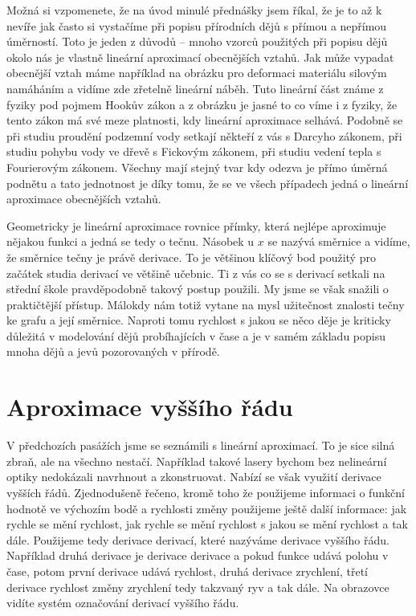 \documentclass[12pt]{article}
\begin{document}
Možná si vzpomenete, že na úvod minulé přednášky jsem říkal, že je to až k nevíře jak často si vystačíme při popisu přírodních dějů s přímou a nepřímou úměrností. Toto je jeden z důvodů -- mnoho vzorců použitých při popisu dějů okolo nás je vlastně lineární aproximací obecnějších vztahů. Jak může vypadat obecnější vztah máme například na obrázku pro deformaci materiálu silovým namáháním a vidíme zde zřetelně lineární náběh. Tuto lineární část známe z fyziky pod pojmem Hookův zákon a z obrázku je jasné to co víme i z fyziky, že tento zákon má své meze platnosti, kdy lineární aproximace selhává. Podobně se při studiu proudění podzemní vody setkají někteří z vás s Darcyho zákonem, při studiu pohybu vody ve dřevě s Fickovým zákonem, při studiu vedení tepla s Fourierovým zákonem. Všechny mají stejný tvar kdy odezva je přímo úměrná podnětu a tato jednotnost je díky tomu, že se ve všech případech jedná o lineární aproximace obecnějších vztahů.

Geometricky je lineární aproximace rovnice přímky, která nejlépe aproximuje nějakou funkci a jedná se tedy o tečnu. Násobek u $x$ se nazývá směrnice a vidíme, že směrnice tečny je právě derivace. To je většinou klíčový bod použitý pro začátek studia derivací ve většině učebnic. Ti z vás co se s derivací setkali na střední škole pravděpodobně takový postup použili. My jsme se však snažili o praktičtější přístup. Málokdy nám totiž vytane na mysl užitečnost znalosti tečny ke grafu a její směrnice. Naproti tomu rychlost s jakou se něco děje je kriticky důležitá v modelování dějů probíhajících v čase a je v samém základu popisu mnoha dějů a jevů pozorovaných v přírodě.

\section*{Aproximace vyššího řádu}

V předchozích pasážích jsme se seznámili s lineární aproximací. To je sice silná zbraň, ale na všechno nestačí. Například takové lasery bychom bez nelineární optiky nedokázali navrhnout a zkonstruovat. Nabízí se však využití derivace vyšších řádů. Zjednodušeně řečeno, kromě toho že použijeme informaci o funkční hodnotě ve výchozím bodě a rychlosti změny použijeme ještě další informace: jak rychle se mění rychlost, jak rychle se mění rychlost s jakou se mění rychlost a tak dále. Použijeme tedy derivace derivací, které nazýváme derivace vyššího řádu. Například druhá derivace je derivace derivace a pokud funkce udává polohu v čase, potom první derivace udává rychlost, druhá derivace zrychlení, třetí derivace rychlost změny zrychlení tedy takzvaný ryv a tak dále. Na obrazovce vidíte systém označování derivací vyššího řádu.
\end{document}
